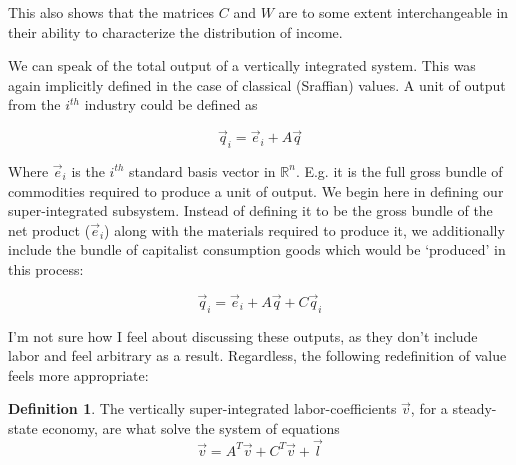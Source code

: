 \documentclass{article}
\theoremstyle{definition}
\newtheorem{definition}{Definition}[section]
\begin{document}
This also shows that the matrices $C$ and $W$ are to some extent interchangeable in their ability to characterize the distribution of income. 

We can speak of the total output of a vertically integrated system. This was again implicitly defined in the case of classical (Sraffian) values. A unit of output from the $i^{th}$ industry could be defined as 

\begin{equation}
    \vec{q}_i = \vec{e}_i+A\vec{q}
\end{equation}

Where $\vec{e}_i$ is the $i^{th}$ standard basis vector in $\mathbb{R}^n$. E.g. it is the full gross bundle of commodities required to produce a unit of output. We begin here in defining our super-integrated subsystem. Instead of defining it to be the gross bundle of the net product ($\vec{e}_i$) along with the materials required to produce it, we additionally include the bundle of capitalist consumption goods which would be `produced' in this process:

\begin{equation}
    \vec{q}_i = \vec{e}_i + A\vec{q}+C\vec{q}_i
\end{equation}


I'm not sure how I feel about discussing these outputs, as they don't include labor and feel arbitrary as a result. Regardless, the following redefinition of value feels more appropriate:

\begin{definition}
The vertically super-integrated labor-coefficients $\vec{v}$, for a steady-state economy, are what solve the system of equations
\begin{equation}
    \vec{v} = A^T\vec{v}+C^T\vec{v}+\vec{l}
\end{equation}
\end{definition}
\end{document}
